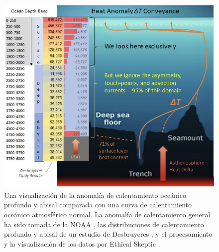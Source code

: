 \documentclass[10pt,twocolumn,letterpaper]{article}
\begin{document}
\begin{figure}[t]
\begin{center}
\includegraphics[width=1\textwidth]{deepsea.jpg}
\end{center}
   \caption{Una visualización de la anomalía de calentamiento oceánico profundo y abisal comparada con una curva de calentamiento oceánico atmosférico normal. La anomalía de calentamiento general ha sido tomada de la NOAA \cite{147}, las distribuciones de calentamiento profundo y abisal de un estudio de Desbruyeres \cite{132}, y el procesamiento y la visualización de los datos por Ethical Skeptic \cite{129}.}
\label{fig:21}
\end{figure}
\end{document}
